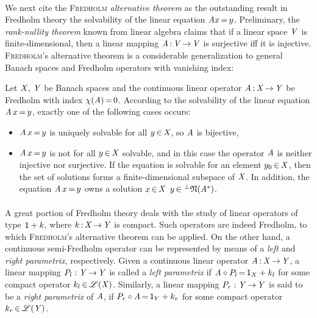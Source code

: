 \documentclass[11pt,twoside]{article}
\begin{document}
\paragraph*{} %
We next cite the \textsc{Fredholm} \textit{alternative theorem}
as the outstanding result in Fredholm theory
{\wrt} the solvability of the linear equation $\mathit{A} x {\,=\,} y$.
Preliminary,
the \textit{rank-nullity theorem} known from linear algebra claims that
if a linear space $\mathit{V}$ is finite-dimensional,
then a linear mapping $\mathit{A} {\,:\,} \mathit{V} {\,\to\,} \mathit{V}$ is surjective
iff it is injective.
\textsc{Fredholm}'s {alternative theorem}
is a considerable generalization to general Banach spaces
and Fredholm operators with vanishing index:

\begin{theorem}\label{FREDHOLM_ALTERNATIVE_THEOREM}
Let $\mathit{X},\,\mathit{Y}$ be Banach spaces and
the continuous linear operator $\mathit{A} {\,:\,} \mathit{X} {\,\to\,} \mathit{Y}$ be Fredholm
with index $\chi(\mathit{A}) {\,=\,} 0$.
According to the solvability of the linear equation $\mathit{A} \, x {\,=\,} y$,
exactly one of the following cases occurs:

\begin{itemize}[leftmargin=15pt]
\item[(a)]
$\mathit{A} \, x {\,=\,} y$ is uniquely solvable for all $y {\,\in\,} \mathit{X}$,
so $\mathit{A}$ is bijective,

\item[(b)]
$\mathit{A} \, x {\,=\,} y$ is not for all $y {\,\in\,} \mathit{X}$ solvable,
and in this case the operator $\mathit{A}$ is neither injective nor surjective.
If the equation is solvable for an element $y_0 {\,\in\,} \mathit{X}$,
then the set of solutions forms a finite-dimensional subspace of $\mathit{X}$.
In addition,
the equation $\mathit{A} \, x {\,=\,} y$ owns a solution $x {\,\in\,} \mathit{X}$
\iff
$y {\,\in\,} \,^{\bot}\mathfrak{N}(\mathit{A}^*)$.
\end{itemize}
\end{theorem}

\paragraph*{} %
A great portion of {Fredholm theory} deals
with the study of linear operators of type ${\mathsf{1}}+k$, 
where $k {\,:\,} \mathit{X} {\,\to\,} \mathit{Y}$ is compact.
Such operators are indeed Fredholm,
to which \textsc{Fredholm}'s alternative theorem can be applied.
On the other hand,
a continuous semi-Fredholm operator can be represented by means of
a \textit{left} and \textit{right parametrix},
respectively.
Given a continuous linear operator $\mathit{A} {\,:\,} \mathit{X} {\,\to\,} \mathit{Y}$,
a linear mapping $P_l:\mathit{Y} {\,\to\,} \mathit{Y}$ is called a \textit{left parametrix}
if $\mathit{A} \circ P_l {\,=\,} {\mathsf{1}}_X + k_l$
for some compact operator $k_l {\,\in\,} \mathscr{L}(\mathit{X})$.
Similarly,
a linear mapping $P_r:\mathit{Y} {\,\to\,} \mathit{Y}$
is said to be a \textit{right parametrix} of $\mathit{A}$,
if $P_r \circ \mathit{A} {\,=\,} {\mathsf{1}}_Y + k_r$
for some compact operator $k_r {\,\in\,} \mathscr{L}(\mathit{Y})$.
\end{document}
